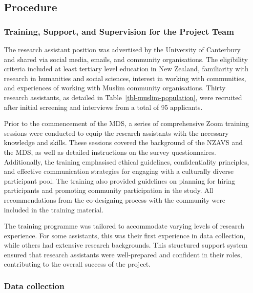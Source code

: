 \documentclass[
]{interact}
\begin{document}
\subsection{Procedure}\label{procedure}

\subsubsection{Training, Support, and Supervision for the Project
Team}\label{training-support-and-supervision-for-the-project-team}

The research assistant position was advertised by the University of
Canterbury and shared via social media, emails, and community
organisations. The eligibility criteria included at least tertiary level
education in New Zealand, familiarity with research in humanities and
social sciences, interest in working with communities, and experiences
of working with Muslim community organisations. Thirty research
assistants, as detailed in Table~\ref{tbl-muslim-population}, were
recruited after initial screening and interviews from a total of 95
applicants.

Prior to the commencement of the MDS, a series of comprehensive Zoom
training sessions were conducted to equip the research assistants with
the necessary knowledge and skills. These sessions covered the
background of the NZAVS and the MDS, as well as detailed instructions on
the survey questionnaires. Additionally, the training emphasised ethical
guidelines, confidentiality principles, and effective communication
strategies for engaging with a culturally diverse participant pool. The
training also provided guidelines on planning for hiring participants
and promoting community participation in the study. All recommendations
from the co-designing process with the community were included in the
training material.

The training programme was tailored to accommodate varying levels of
research experience. For some assistants, this was their first
experience in data collection, while others had extensive research
backgrounds. This structured support system ensured that research
assistants were well-prepared and confident in their roles, contributing
to the overall success of the project.

\subsubsection{Data collection}\label{data-collection}
\end{document}
